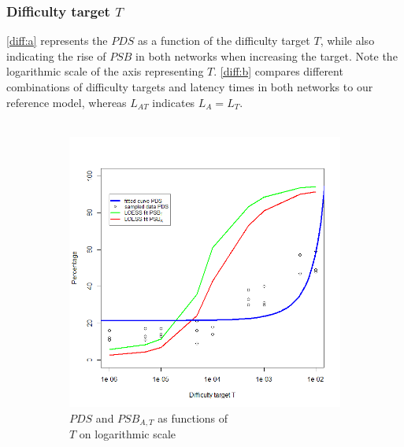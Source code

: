 \documentclass[a4paper,12pt,twoside]{report}
\begin{document}
\subsubsection{Difficulty target $T$}
\autoref{diff:a} represents the $PDS$ as a function of the difficulty target $T$, while also indicating the rise of $PSB$ in both networks when increasing the target. Note the logarithmic scale of the axis representing $T$. \autoref{diff:b} compares different combinations of difficulty targets and latency times in both networks to our reference model, whereas $L_{AT}$ indicates $L_{A} = L_{T}$.\\\\ \begin{figure}
\centering
\begin{subfigure}{.5\textwidth}
  \centering
  \includegraphics[width=\linewidth]{Experiments/Difficulty/difficultyfit.png}
  \caption{$PDS$ and $PSB_{A,T}$ as functions of \\ $T$ on logarithmic scale}
  \label{diff:a}
\end{subfigure}%
\begin{subfigure}{.5\textwidth}
  \centering

\end{subfigure}
\end{figure}
\end{document}

